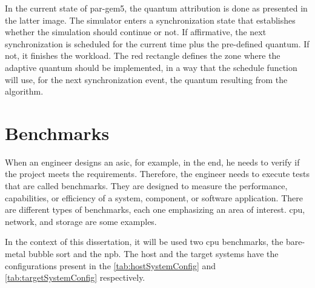 In the current state of par-gem5, the quantum attribution is done as presented in the latter image. The simulator enters a synchronization state 
that establishes whether the simulation should continue or not. If affirmative, the next synchronization is scheduled for the current time plus 
the pre-defined quantum. If not, it finishes the workload. The red rectangle defines the zone where the adaptive quantum should be implemented, 
in a way that the schedule function will use, for the next synchronization event, the quantum resulting from the algorithm. 

\section{Benchmarks}

When an engineer designs an \gls{asic}, for example, in the end, he needs to verify if the project meets the requirements. Therefore, the engineer 
needs to execute tests that are called benchmarks. They are designed to measure the performance, capabilities, or efficiency of a system, 
component, or software application. There are different types of benchmarks, each one emphasizing an area of interest. \gls{cpu}, network, and 
storage are some examples. 

In the context of this dissertation, it will be used two \gls{cpu} benchmarks, the bare-metal bubble sort and the \gls{npb}. The host and the 
target systems have the configurations present in the \autoref{tab:hostSystemConfig} and \autoref{tab:targetSystemConfig} respectively.   

